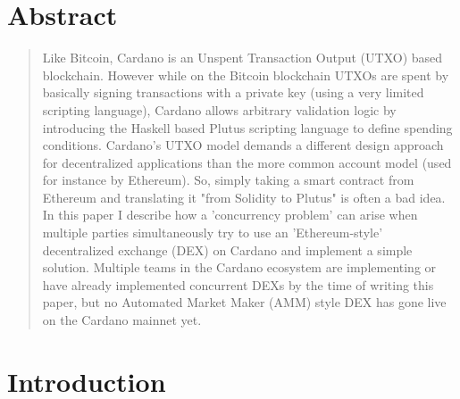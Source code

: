 \documentclass[a4paper,twoside,12pt]{report}
\begin{document}
\chapter*{\centering Abstract}
\begin{quote}\noindent
    Like Bitcoin, Cardano is an Unspent Transaction Output (UTXO) based blockchain. However while on the Bitcoin blockchain UTXOs are spent by basically signing transactions with a private key (using a very limited scripting language), Cardano allows arbitrary validation logic by introducing the Haskell based Plutus scripting language to define spending conditions. Cardano's UTXO model demands a different design approach for decentralized applications than the more common account model (used for instance by Ethereum). So, simply taking a smart contract from Ethereum and translating it "from Solidity to Plutus" is often a bad idea. In this paper I describe how a 'concurrency problem' can arise when multiple parties simultaneously try to use an 'Ethereum-style' decentralized exchange (DEX) on Cardano and implement a simple solution. Multiple teams in the Cardano ecosystem are implementing or have already implemented concurrent DEXs by the time of writing this paper, but no Automated Market Maker (AMM) style DEX has gone live on the Cardano mainnet yet.
\end{quote}

\tableofcontents


\cleardoublepage



\chapter{Introduction}
\label{ch:intro}
\end{document}
